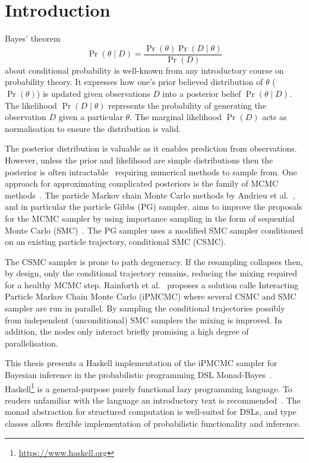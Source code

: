 \section{Introduction}

Bayes' theorem
\begin{equation}
    \Pr(\theta\mid D) = \frac {\Pr(\theta) \Pr(D \mid \theta)}{\Pr(D)}
\end{equation}
about conditional probability is well-known from any introductory course on probability theory. It expresses how one's prior believed distribution of $\theta$ ($\Pr(\theta)$) is updated given observations $D$ into a posterior belief $\Pr(\theta\mid D)$. The likelihood $\Pr(D \mid \theta)$ represents the probability of generating the observation $D$ given a particular $\theta$. The marginal likelihood $\Pr(D)$ acts as normalisation to ensure the distribution is valid.

The posterior distribution is valuable as it enables prediction from observations. However, unless the prior and likelihood are simple distributions then the posterior is often intractable~\cite{barber} requiring numerical methods to sample from. One approach for approximating complicated posteriors is the family of MCMC  methods~\cite{robert}. The particle Markov chain Monte Carlo methods by Andrieu et al.~\cite{pmcmc}, and in particular the particle Gibbs (PG) sampler, aims to improve the proposals for the MCMC sampler by using importance sampling in the form of sequential Monte Carlo (SMC)~\cite{smc}. The PG sampler uses a modified SMC sampler conditioned on an existing particle trajectory, conditional SMC (CSMC).

The CSMC sampler is prone to path degeneracy. If the resampling collapses then, by design, only the conditional trajectory remains, reducing the mixing required for a healthy MCMC step. Rainforth et al.~\cite{ipmcmc} proposes a solution calle Interacting Particle Markov Chain Monte Carlo (iPMCMC) where several CSMC and SMC sampler are run in parallel. By sampling the conditional trajectories possibly from independent (unconditional) SMC samplers the mixing is improved. In addition, the nodes only interact briefly promising a high degree of parallelisation.

This thesis presents a Haskell implementation of the iPMCMC sampler for Bayesian inference in the probabilistic programming DSL Monad-Bayes~\cite{mbayes}. Haskell\footnote{\url{https://www.haskell.org}} is a general-purpose purely functional lazy programming language. To readers unfamiliar with the language an introductory text is recommended~\cite{haskell}. The monad abstraction for structured computation is well-suited for DSLs, and type classes allows flexible implementation of probabilistic functionality and inference.

